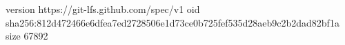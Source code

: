 version https://git-lfs.github.com/spec/v1
oid sha256:812d472466e6dfea7ed2728506e1d73ce0b725fef535d28aeb9c2b2dad82bf1a
size 67892
